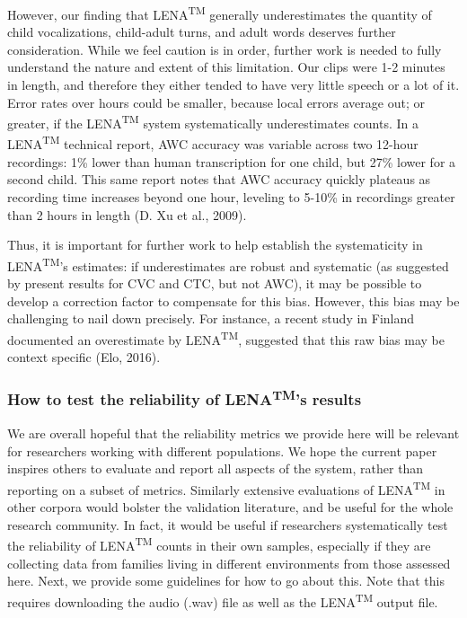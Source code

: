 \documentclass[english,table,man,floatsintext]{apa6}
\begin{document}
However, our finding that LENA\textsuperscript{TM} generally underestimates the quantity of child vocalizations, child-adult turns, and adult words deserves further consideration. While we feel caution is in order, further work is needed to fully understand the nature and extent of this limitation. Our clips were 1-2 minutes in length, and therefore they either tended to have very little speech or a lot of it. Error rates over hours could be smaller, because local errors average out; or greater, if the LENA\textsuperscript{TM} system systematically underestimates counts. In a LENA\textsuperscript{TM} technical report, AWC accuracy was variable across two 12-hour recordings: 1\% lower than human transcription for one child, but 27\% lower for a second child. This same report notes that AWC accuracy quickly plateaus as recording time increases beyond one hour, leveling to 5-10\% in recordings greater than 2 hours in length (D. Xu et al., 2009).

Thus, it is important for further work to help establish the systematicity in LENA\textsuperscript{TM}'s estimates: if underestimates are robust and systematic (as suggested by present results for CVC and CTC, but not AWC), it may be possible to develop a correction factor to compensate for this bias. However, this bias may be challenging to nail down precisely. For instance, a recent study in Finland documented an overestimate by LENA\textsuperscript{TM}, suggested that this raw bias may be context specific (Elo, 2016).

\hypertarget{how-to-test-the-reliability-of-lenatms-results}{%
\subsubsection{\texorpdfstring{How to test the reliability of LENA\textsuperscript{TM}'s results}{How to test the reliability of LENATM's results}}\label{how-to-test-the-reliability-of-lenatms-results}}

We are overall hopeful that the reliability metrics we provide here will be relevant for researchers working with different populations. We hope the current paper inspires others to evaluate and report all aspects of the system, rather than reporting on a subset of metrics. Similarly extensive evaluations of LENA\textsuperscript{TM} in other corpora would bolster the validation literature, and be useful for the whole research community. In fact, it would be useful if researchers systematically test the reliability of LENA\textsuperscript{TM} counts in their own samples, especially if they are collecting data from families living in different environments from those assessed here. Next, we provide some guidelines for how to go about this. Note that this requires downloading the audio (.wav) file as well as the LENA\textsuperscript{TM} output file.
\end{document}
